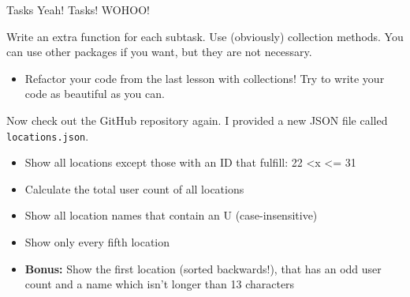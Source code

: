 \begin{frame}{Tasks}
	Yeah! Tasks! WOHOO!
	
	Write an extra function for each subtask. Use (obviously) collection methods. You can use other packages if you want, but they are not necessary.\pause 
	\begin{itemize}
		\item Refactor your code from the last lesson with collections! Try to write your code as beautiful as you can. \pause
	\end{itemize}
	Now check out the GitHub repository again. I provided a new JSON file called \texttt{locations.json}. \pause
	\begin{itemize}
		\item Show all locations except those with an ID that fulfill: 22 \textless  x \textless= 31 \pause			
		\item Calculate the total user count of all locations \pause	
		\item Show all location names that contain an U (case-insensitive) \pause
		\item Show only every fifth location \pause	
		\item \textbf{Bonus:} Show the first location (sorted backwards!), that has an odd user count and a name which isn't longer than 13 characters
	\end{itemize}
\end{frame}




